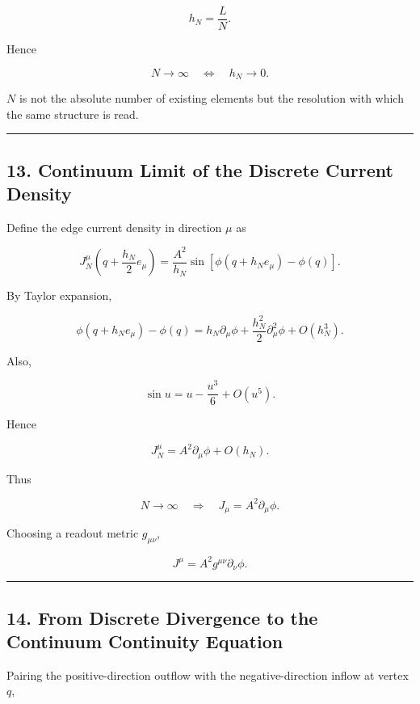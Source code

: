 \documentclass[
  a4paper,
]{article}
\begin{document}
\[
\boxed{
h_N=\frac{L}{N}.
}
\tag{41}
\]

Hence

\[
\boxed{
N\to\infty
\quad\Longleftrightarrow\quad
h_N\to0.
}
\tag{42}
\]

\(N\) is not the absolute number of existing elements but the resolution
with which the same structure is read.

\begin{center}\rule{0.5\linewidth}{0.5pt}\end{center}

\subsection{13. Continuum Limit of the Discrete Current
Density}\label{continuum-limit-of-the-discrete-current-density}

Define the edge current density in direction \(\mu\) as

\[
\boxed{
J_N^\mu
\left(
q+\frac{h_N}{2}e_\mu
\right)
=
\frac{A^2}{h_N}
\sin
\left[
\phi(q+h_Ne_\mu)-\phi(q)
\right].
}
\tag{43}
\]

By Taylor expansion,

\[
\phi(q+h_Ne_\mu)
-
\phi(q)
=
h_N\partial_\mu\phi
+
\frac{h_N^2}{2}
\partial_\mu^2\phi
+
O(h_N^3).
\tag{44}
\]

Also,

\[
\sin u
=
u
-
\frac{u^3}{6}
+
O(u^5).
\tag{45}
\]

Hence

\[
J_N^\mu
=
A^2\partial_\mu\phi
+
O(h_N).
\tag{46}
\]

Thus

\[
\boxed{
N\to\infty
\quad\Longrightarrow\quad
J_\mu
=
A^2\partial_\mu\phi.
}
\tag{47}
\]

Choosing a readout metric \(g_{\mu\nu}\),

\[
\boxed{
J^\mu
=
A^2g^{\mu\nu}\partial_\nu\phi.
}
\tag{48}
\]

\begin{center}\rule{0.5\linewidth}{0.5pt}\end{center}

\subsection{14. From Discrete Divergence to the Continuum Continuity
Equation}\label{from-discrete-divergence-to-the-continuum-continuity-equation}

Pairing the positive-direction outflow with the negative-direction
inflow at vertex \(q\),
\end{document}
